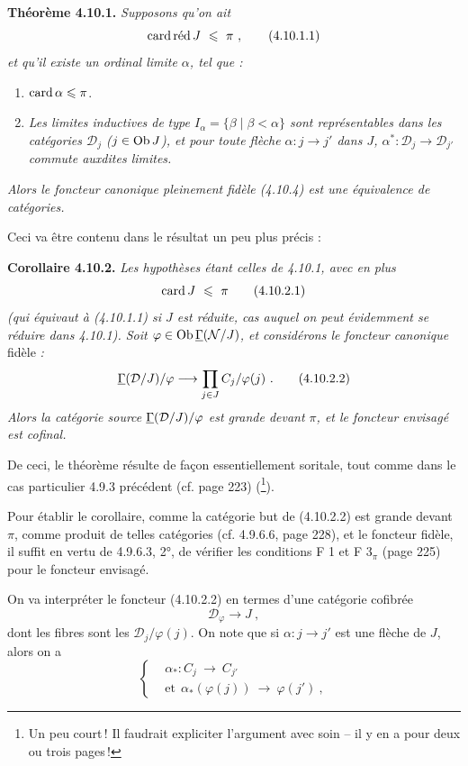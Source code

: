 
\textbf{Théorème 4.10.1.} \textit{Supposons qu'on ait}
\[
\mathrm{card}\,\textup{réd}\, J \ \leqslant \ \pi \ , \tag*{(4.10.1.1)}
\]
\textit{et qu'il existe un ordinal limite $\alpha$, tel que :}
\begin{enumerate}[label={}, leftmargin=3em]
\item[\textit{1)}] $\operatorname{card} \alpha \leqslant \pi$.
\item[\textit{2)}] \textit{Les limites inductives de}
\textit{type $I_\alpha = \{\beta \mid \beta < \alpha\}$ sont représentables dans les catégories $\mathcal{D}_j$ ($j \in \operatorname{Ob} J$), et pour toute flèche $\alpha : j \longrightarrow j'$ dans $J$, $\alpha^* : \mathcal{D}_j \longrightarrow \mathcal{D}_{j'}$ commute auxdites limites.}
\end{enumerate}
\textit{Alors le foncteur canonique pleinement fidèle (4.10.4) est une équivalence de catégories.}

Ceci va être contenu dans le résultat un peu plus précis :

\textbf{Corollaire 4.10.2.} \textit{Les hypothèses étant celles de 4.10.1, avec en plus}
\[
\card J \ \leqslant \ \pi \tag*{(4.10.2.1)}
\]
\textit{(qui équivaut à (4.10.1.1) si $J$ est réduite, cas auquel on peut évidemment se réduire dans 4.10.1). Soit $\varphi \in \operatorname{Ob} \underline{\Gamma}(\mathcal{N}/J)$, et considérons le foncteur canonique} fidèle \textit{:}
\[
\uGamma(\mathcal{D}/J)/\varphi \longrightarrow \prod_{j\in J} C_j/\varphi(j) \ . \tag*{(4.10.2.2)}
\]
\textit{Alors la catégorie source $\underline{\Gamma}(\mathcal{D}/J)/\varphi$ est grande devant $\pi$, et le foncteur envisagé est cofinal.}

De ceci, le théorème résulte de façon essentiellement soritale, tout comme dans le cas particulier 4.9.3 précédent (cf. page 223) (\footnote{Un peu court\,! Il faudrait expliciter l'argument avec soin – il y en a pour deux ou trois pages\,!}).

Pour établir le corollaire, comme la catégorie but de (4.10.2.2) est grande devant $\pi$, comme produit de telles catégories (cf. 4.9.6.6, page 228), et le foncteur fidèle, il suffit en vertu de 4.9.6.3, 2°, de vérifier les conditions F 1 et F 3$_\pi$ (page 225) pour le foncteur envisagé.

On va interpréter le foncteur (4.10.2.2) en termes d'une catégorie cofibrée
\[
\mathcal{D}_\varphi \longrightarrow J \ , \tag*{(4.10.5)}
\]
dont les fibres sont les $\mathcal{D}_j/\varphi(j)$. On note que si $\alpha : j \longrightarrow j'$ est une flèche de $J$, alors on a
\[
\left\{
\begin{aligned}
&\alpha_* : C_j \ \longrightarrow \ C_{j'} \\
&\text{et} \ \ \alpha_*(\varphi(j)) \ \longrightarrow \ \varphi(j') \ ,
\end{aligned}
\right.
\]

